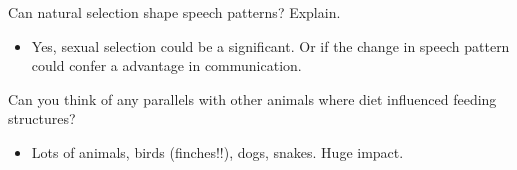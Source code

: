 \documentclass[12pt,a4paper]{article}
\begin{document}
\begin{enumerate}
    {\color{darklc}\item Can natural selection shape speech patterns? Explain.}
        \begin{itemize}
            \item Yes, sexual selection could be a significant. Or if the change in speech pattern could confer a advantage in communication.
        \end{itemize}
    {\color{darklc}\item Can you think of any parallels with other animals where diet influenced feeding structures?}
        \begin{itemize}
            \item Lots of animals, birds (finches!!), dogs, snakes. Huge impact.
        \end{itemize}
\end{enumerate}
\end{document}
